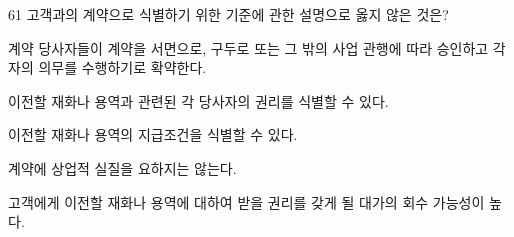 \begin{question}{61}
고객과의 계약으로 식별하기 위한 기준에 관한 설명으로 옳지 않은 것은?
\begin{choices}
  \item 계약 당사자들이 계약을 서면으로, 구두로 또는 그 밖의 사업 관행에 따라 승인하고 각자의 의무를 수행하기로 확약한다.
  \item 이전할 재화나 용역과 관련된 각 당사자의 권리를 식별할 수 있다.
  \item 이전할 재화나 용역의 지급조건을 식별할 수 있다.
  \item 계약에 상업적 실질을 요하지는 않는다.
  \item 고객에게 이전할 재화나 용역에 대하여 받을 권리를 갖게 될 대가의 회수 가능성이 높다.
\end{choices}
\end{question}
